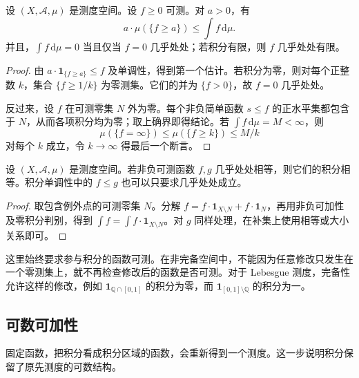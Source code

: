 \begin{proposition}\label{b1:prop:integral-markov}
设 \((X,\mathcal A,\mu)\) 是测度空间。设 \(f\geq0\) 可测。对 \(a>0\)，有
\[
a\cdot\mu(\{f\geq a\})\leq\int f\,\mathrm d\mu.
\]
并且，\(\int f\,\mathrm d\mu=0\) 当且仅当 \(f=0\) 几乎处处；若积分有限，则 \(f\) 几乎处处有限。
\end{proposition}
\begin{proof}
由 \(a\cdot\mathbf1_{\{f\geq a\}}\leq f\) 及单调性，得到第一个估计。若积分为零，则对每个正整数 \(k\)，集合 \(\{f\geq1/k\}\) 为零测集。它们的并为 \(\{f>0\}\)，故 \(f=0\) 几乎处处。

反过来，设 \(f\) 在可测零集 \(N\) 外为零。每个非负简单函数 \(s\leq f\) 的正水平集都包含于 \(N\)，从而各项积分均为零；取上确界即得结论。若 \(\int f\,\mathrm d\mu=M<\infty\)，则
\[
\mu(\{f=\infty\})\leq\mu(\{f\geq k\})\leq M/k
\]
对每个 \(k\) 成立，令 \(k\to\infty\) 得最后一个断言。
\end{proof}

\begin{corollary}\label{b1:cor:integral-ae-invariance}
设 \((X,\mathcal A,\mu)\) 是测度空间。若非负可测函数 \(f,g\) 几乎处处相等，则它们的积分相等。积分单调性中的 \(f\leq g\) 也可以只要求几乎处处成立。
\end{corollary}
\begin{proof}
取包含例外点的可测零集 \(N\)。分解 \(f=f\cdot\mathbf1_{X\setminus N}+f\cdot\mathbf1_N\)，再用非负可加性及零积分判别，得到
\(\int f=\int f\cdot\mathbf1_{X\setminus N}\)。对 \(g\) 同样处理，在补集上使用相等或大小关系即可。
\end{proof}

这里始终要求参与积分的函数可测。在非完备空间中，不能因为任意修改只发生在一个零测集上，就不再检查修改后的函数是否可测。对于 Lebesgue 测度，完备性允许这样的修改，例如 \(\mathbf1_{\mathbb Q\cap[0,1]}\) 的积分为零，而 \(\mathbf1_{[0,1]\setminus\mathbb Q}\) 的积分为一。

\subsection{可数可加性}
\label{b1:subsec:050104}

固定函数，把积分看成积分区域的函数，会重新得到一个测度。这一步说明积分保留了原先测度的可数结构。

